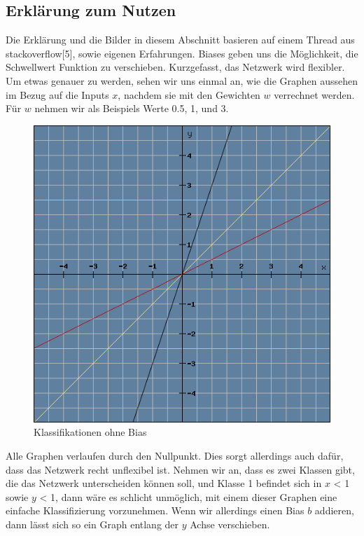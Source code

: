 \documentclass[12pt]{article}
\begin{document}
\subsection{Erklärung zum Nutzen} Die Erklärung und die Bilder in diesem Abschnitt basieren auf einem Thread aus stackoverflow[5], sowie eigenen Erfahrungen. Biases geben uns die Möglichkeit, die Schwellwert Funktion zu verschieben. Kurzgefasst, das Netzwerk wird flexibler. 
Um etwas genauer zu werden, sehen wir uns einmal an, wie die Graphen aussehen im Bezug auf die Inputs $x$, nachdem sie mit den Gewichten $w$ verrechnet werden. Für $w$ nehmen wir als Beispiels Werte 0.5, 1, und 3.
\begin{figure}[H]
\centering
\includegraphics[scale=0.60]{./Images/Pasted image 20231005144238.png}
\caption{Klassifikationen ohne Bias}
\label{Klassifikationen ohne Bias}
\end{figure}
Alle Graphen verlaufen durch den Nullpunkt. Dies sorgt allerdings auch dafür, dass das Netzwerk recht unflexibel ist. Nehmen wir an, dass es zwei Klassen gibt, die das Netzwerk unterscheiden können soll, und Klasse 1 befindet sich in $x$ < 1 sowie $y$ < 1, dann wäre es schlicht unmöglich, mit einem dieser Graphen eine einfache Klassifizierung vorzunehmen. Wenn wir allerdings einen Bias $b$ addieren, dann lässt sich so ein Graph entlang der $y$ Achse verschieben.
\end{document}
